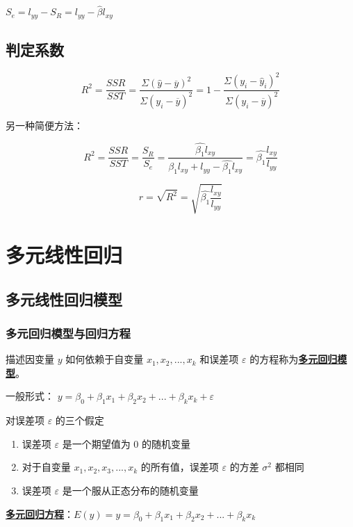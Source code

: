 \documentclass[UTF8,10pt]{book}
\begin{document}
\( S_e = l_{yy} - S_R = l_{yy}-\hat{\beta}l_{xy} \)

\subsection{判定系数}\label{header-n124}

\[R^2 = \frac{SSR}{SST}=\frac{\Sigma(\hat{y}-\overline{y})^2}{\Sigma(y_i-\overline{y})^2} = 1 - \frac{\Sigma(y_i - \hat{y}_i)^2}{\Sigma(y_i-\overline{y})^2}\]

另一种简便方法：

\[R^2 = \frac{SSR}{SST}= \frac{S_R}{S_e} = \frac{\hat{\beta_1}  l_{xy}}{\hat{\beta_1}  l_{xy}+l_{yy}- \hat{\beta_1} l_{xy}}=\hat{\beta_1} \frac{l_{xy}}{l_{yy}}\]

\[r = \sqrt{R^2}=\sqrt{\hat{\beta_1} \frac{l_{xy}}{l_{yy}}}\]

\section{多元线性回归}\label{header-n133}

\subsection{多元线性回归模型}\label{header-n134}

\subsubsection{多元回归模型与回归方程}\label{header-n136}

描述因变量 \(y\) 如何依赖于自变量 \(x_1,x_2,...,x_k\) 和误差项
\(\varepsilon\) 的方程称为\textbf{\underline{多元回归模型}}。

一般形式：
\( y = \beta_0 + \beta_1 x_1 + \beta_2 x_2 + ... + \beta_k x_k + \varepsilon \)

对误差项 \(\varepsilon\) 的三个假定

\begin{enumerate}
	\def\labelenumi{\arabic{enumi}.}
	\item
	误差项 \(\varepsilon\) 是一个期望值为 \(0\) 的随机变量
	\item
	对于自变量 \( x_1, x_2 , x_3 , ... ,x_k \) 的所有值，误差项
	\(\varepsilon\) 的方差 \( \sigma^2 \) 都相同
	\item
	误差项 \(\varepsilon\) 是一个服从正态分布的随机变量
\end{enumerate}

\textbf{\underline{多元回归方程}}：\( E(y) = y = \beta_0 + \beta_1 x_1 + \beta_2 x_2 + ... + \beta_k x_k \)
\end{document}
